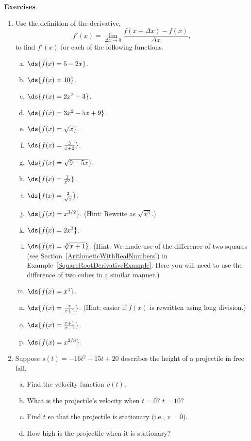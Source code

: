 \begin{center}\underline{\Large{\bf Exercises}}\end{center}
\bigskip
\begin{multicols}{2}
\begin{enumerate}
\item  Use the definition of the derivative, 
$$f'(x)=\lim_{\Delta x\to0}\frac{f(x+\Delta x)-f(x)}{\Delta x},$$
to find $f'(x)$ for each of the following functions.
\begin{enumerate}[a.]
\item $\ds{f(x)=5-2x}$.
\item $\ds{f(x)=10}$.
\item $\ds{f(x)=2x^2+3}$.
\item $\ds{f(x)=3x^2-5x+9}$.
\item $\ds{f(x)=\sqrt{x}}$.
\item $\ds{f(x)=\frac3{x+2}}$.
\item $\ds{f(x)=\sqrt{9-5x}}$.
\item $\ds{f(x)=\frac1{x^2}}$.
\item $\ds{f(x)=\frac2{\sqrt{x}}}$.
\item $\ds{f(x)=x^{3/2}}$.  (Hint: Rewrite as $\sqrt{x^3}$.)
\item $\ds{f(x)=2x^3}$.
\item $\ds{f(x)=\sqrt[3]{x+1}}$.  (Hint: We made use of the difference
of two squares (see  Section~\ref{ArithmeticWithRealNumbers})
in Example~\ref{SquareRootDerivativeExample}.  Here you will
need to use the difference of two cubes in a similar manner.)
\item $\ds{f(x)=x^4}$.
\item $\ds{f(x)=\frac{x}{x+1}}$. (Hint: easier if $f(x)$ is rewritten
 using long division.)
\item $\ds{f(x)=\frac{x+1}{x-1}}$.
\item $\ds{f(x)=x^{2/3}}$.
\end{enumerate}
\item Suppose $s(t)=-16t^2+15t+20$ describes the height of
a projectile in free fall.
\begin{enumerate}[a.]
\item Find the velocity function $v(t)$.
\item  What is the projectile's velocity when $t=0$? $t=10$?
\item Find $t$  so that the projectile is stationary (i.e., $v=0$).
\item How high is the projectile when it is stationary?
\end{enumerate}


\end{enumerate}
\end{multicols}
